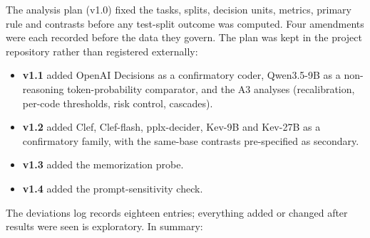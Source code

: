 The analysis plan (v1.0) fixed the tasks, splits, decision units, metrics, primary rule and contrasts before any test-split
outcome was computed. Four amendments were each recorded before the data they govern. The plan was kept in the project
repository rather than registered externally:
\begin{itemize}
  \item \textbf{v1.1} added OpenAI Decisions as a confirmatory coder, Qwen3.5-9B as a non-reasoning token-probability
  comparator, and the A3 analyses (recalibration, per-code thresholds, risk control, cascades).
  \item \textbf{v1.2} added Clef, Clef-flash, pplx-decider, Kev-9B and Kev-27B as a confirmatory family, with the
  same-base contrasts pre-specified as secondary.
  \item \textbf{v1.3} added the memorization probe.
  \item \textbf{v1.4} added the prompt-sensitivity check.
\end{itemize}
The deviations log records eighteen entries; everything added or changed after results were seen is exploratory. In summary:
